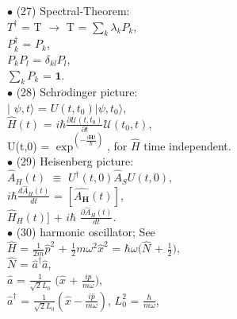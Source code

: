 \documentclass[a4paper, 10pt, onepage]{elegantbook}
\begin{document}
{$\bullet$ (27) Spectral-Theorem:   \\

$T^\dagger$ = T $\longrightarrow$ T = $\sum_k \lambda_k P_k$, \\

$P^\dagger_k$ = $P_k$,  \\

$P_k P_l$ = $\delta_{kl} P_l$,  \\

$\sum_k P_k$ = $\mathbf{1}$.  \\

$\bullet$ (28) Schr$\ddot{o}$dinger picture:  \\

$\mid$ $\psi,t \rangle$ = $U(t,t_0) | \psi,t_0 \rangle$, \\

$\hat{H}(t)$ = $i \hbar \frac{\partial \mathcal U(t, t_0)}{\partial t} \mathcal U(t_0,t)$,  \\

U(t,0) = $\exp^{( - \frac{i \hat{\mathbf H} t} {\hbar} ) }$, for $\hat{H}$ $\text{time}$ independent. \\

$\bullet$ (29) Heisenberg picture: \\

$\hat{A}_H(t)$ $\equiv$ $U^\dagger(t,0) \hat{A}_S U(t,0)$,  \\

$i \hbar \frac{d \hat{A}_H(t)}{dt}$ = $[\hat{A_\mathbf H}(t)]$,   \\

$\hat{H}_H(t)]$ + $i \hbar$ $\frac{\partial \hat{A}_H(t)}{dt}$.  \\

$\bullet$ (30) harmonic oscillator; See \pageref{Harmonic Oscillator}  \\

$\hat{H}$ = $\frac{1}{2m} \hat{p}^2$ + $\frac{1}{2}m \omega^2 \hat{x}^2$ = $ \hbar \omega(\hat{N}$ + $\frac{1}{2})$,  \\

$\hat{N}$ = $\hat{a}^\dagger \hat{a}$,  \\  

$\hat{a}$ = $\frac{1}{\sqrt{2}L_0}$ $(\hat{x}$ + $\frac{i \hat{p}}{m \omega})$,  \\

$\hat{a}^\dagger$ = $\frac{1}{\sqrt{2}L_0}(\hat{x} - \frac{i \hat{p}}{m \omega})$, $L^2_0$ = $\frac{\hbar}{m \omega}$,  \\

}
\end{document}
